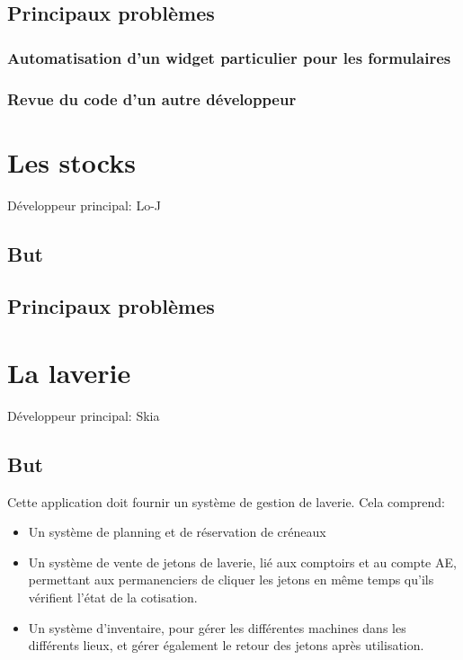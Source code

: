 \documentclass[a4paper]{report}
\begin{document}
\section{Principaux problèmes}
\label{sec:principaux_problemes}

\subsection{Automatisation d'un widget particulier pour les formulaires}
\label{sub:automatisation_d_un_widget_particulier_pour_les_formulaires}

\subsection{Revue du code d'un autre développeur}
\label{sub:revue_du_code_d_un_autre_developpeur}


\chapter{Les stocks}
\label{sub:les_stocks}
\par Développeur principal: Lo-J

\section{But}
\label{sec:but}

\section{Principaux problèmes}
\label{sec:principaux_problemes}


\chapter{La laverie}
\label{sec:la_laverie}
\par Développeur principal: Skia

\section{But}
\label{sub:but}
\par Cette application doit fournir un système de gestion de laverie. Cela comprend:
\begin{itemize}
    \item Un système de planning et de réservation de créneaux
    \item Un système de vente de jetons de laverie, lié aux comptoirs et au compte AE, permettant aux permanenciers de
        cliquer les jetons en même temps qu'ils vérifient l'état de la cotisation.
    \item Un système d'inventaire, pour gérer les différentes machines dans les différents lieux, et gérer également le
        retour des jetons après utilisation.
\end{itemize}
\end{document}
